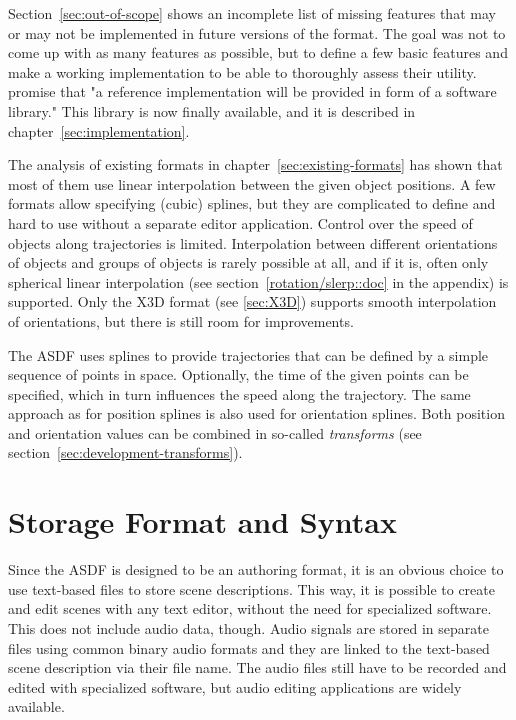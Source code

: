 Section~\ref{sec:out-of-scope} shows an incomplete list of missing features
that may or may not be implemented in future versions of the format.
The goal was not to come up with as many features as possible,
but to define a few basic features and make a working implementation
to be able to thoroughly assess their utility.
\textcite{geier2010future} promise that
"a reference implementation will be provided in form of a software library."
This library is now finally available,
and it is described in chapter~\ref{sec:implementation}.

The analysis of existing formats in chapter~\ref{sec:existing-formats}
has shown that most of them use linear interpolation
between the given object positions.
A few formats allow specifying (cubic) splines,
but they are complicated to define and hard to use without a separate
editor application.
Control over the speed of objects along trajectories is limited.
Interpolation between different orientations of objects and groups of objects
is rarely possible at all,
and if it is,
often only spherical linear interpolation (see section~\ref{rotation/slerp::doc} in the appendix)
is supported.
Only the X3D format (see \ref{sec:X3D})
supports smooth interpolation of orientations,
but there is still room for improvements.

The ASDF uses splines to provide trajectories that can be defined by a simple
sequence of points in space.
Optionally, the time of the given points can be specified,
which in turn influences the speed along the trajectory.
The same approach as for position splines is also used for orientation splines.
Both position and orientation values can be combined in so-called
\emph{transforms} (see section~\ref{sec:development-transforms}).


\section{Storage Format and Syntax}

Since the ASDF is designed to be an authoring format,
it is an obvious choice to use text-based files to store scene descriptions.
This way, it is possible to create and edit scenes with any text editor,
without the need for specialized software.
This does not include audio data, though.
Audio signals are stored in separate files using common binary audio
formats and they are linked
to the text-based scene description
via their file name.
The audio files still have to be recorded and edited with specialized software,
but audio editing applications are widely available.

